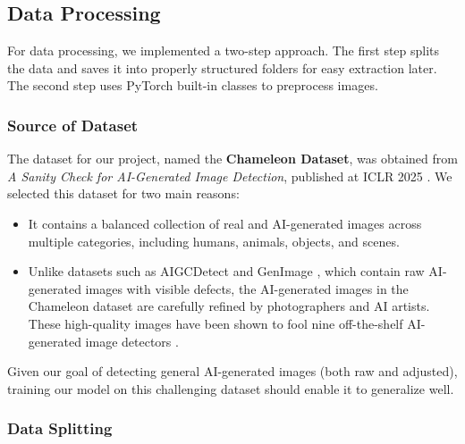 \documentclass{article} %
\begin{document}
\subsection{Data Processing}

For data processing, we implemented a two-step approach. The first step splits the data and saves it into properly structured folders for easy extraction later. The second step uses PyTorch built-in classes to preprocess images.
\subsubsection{Source of Dataset}
The dataset for our project, named the \textbf{Chameleon Dataset}, was obtained from \emph{A Sanity Check for AI-Generated Image Detection}, published at ICLR 2025 \citep{yan2024sanity}. We selected this dataset for two main reasons:

\begin{itemize}
    \item It contains a balanced collection of real and AI-generated images across multiple categories, including humans, animals, objects, and scenes.
    \item Unlike datasets such as AIGCDetect \citep{rptc} and GenImage \citep{zhu2023gendet}, which contain raw AI-generated images with visible defects, the AI-generated images in the Chameleon dataset are carefully refined by photographers and AI artists. These high-quality images have been shown to fool nine off-the-shelf AI-generated image detectors \citep{yan2024sanity}.
\end{itemize}


Given our goal of detecting general AI-generated images (both raw and adjusted), training our model on this challenging dataset should enable it to generalize well.

\subsubsection{Data Splitting}
\end{document}
